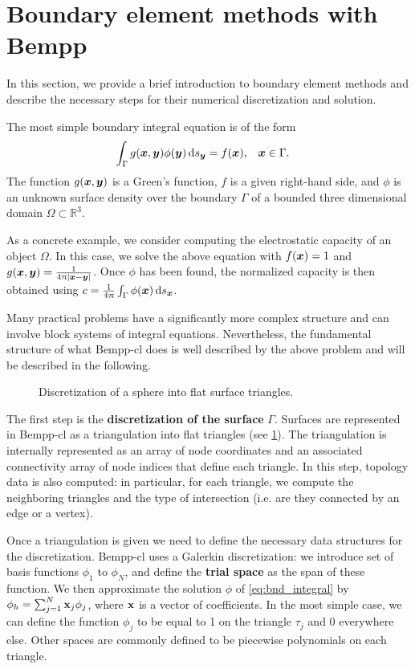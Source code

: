 \section{Boundary element methods with Bempp}
In this section, we provide a brief introduction to boundary element methods and describe the necessary steps for their numerical discretization and solution.

The most simple boundary integral equation is of the form
\begin{align}
  \label{eq:bnd_integral}
  \int_{\Gamma} g(\bx, \by)\phi(\by)\ds[\by] &= f(\bx),&&\bx\in\Gamma.
\end{align}
The function $g(\boldsymbol{x}, \boldsymbol{y})$ is a Green's function, $f$ is a given right-hand side, and $\phi$ is an unknown surface density over the boundary $\Gamma$ of a bounded three dimensional domain $\Omega\subset\mathbb{R}^3$.

As a concrete example, we consider computing the electrostatic capacity of an object $\Omega$. In this case, we solve the above equation with $f(\boldsymbol{x})=1$ and $g(\boldsymbol{x},\boldsymbol{y})=\frac{1}{4\uppi|\boldsymbol{x} - \boldsymbol{y}|}$. Once $\phi$ has been found, the normalized capacity is then obtained using $c = \frac{1}{4\uppi}\int_{\Gamma}\phi(\bx)\ds[\bx]$.

Many practical problems have a significantly more complex structure and can involve block systems of integral equations. Nevertheless, the fundamental structure of what Bempp-cl does is well described by the above problem and will be described in the following.

\begin{figure}
  \centering
  
  \caption{Discretization of a sphere into flat surface triangles.}
  \label{fig:triangulation}
\end{figure}

The first step is the \textbf{discretization of the surface} $\Gamma$. Surfaces are represented in Bempp-cl as a triangulation into flat triangles (see \cref{fig:triangulation}). The triangulation is internally represented as an array of node coordinates and an associated connectivity array of node indices that define each triangle. In this step, topology data is also computed: in particular, for each triangle, we compute the neighboring triangles and the type of intersection (i.e. are they connected by an edge or a vertex).

Once a triangulation is given we need to define the necessary data structures for the discretization. Bempp-cl uses a Galerkin discretization: we introduce set of basis functions \(\phi_1\) to \(\phi_N\), and define the \textbf{trial space} as the span of these function. We then approximate the solution \(\phi\) of \cref{eq:bnd_integral} by $\phi_h=\sum_{j=1}^N \mathbf{x}_j\phi_j$, where $\mathbf{x}$ is a vector of coefficients. In the most simple case, we can define the function \(\phi_j\) to be equal to 1 on the triangle $\tau_j$ and 0 everywhere else. Other spaces are commonly defined to be piecewise polynomials on each triangle.

